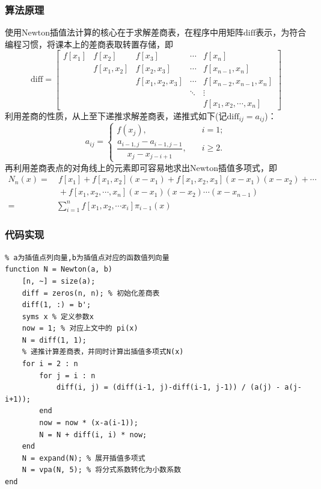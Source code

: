\documentclass[12pt, a4paper, oneside]{ctexart}
\begin{document}
\subsubsection{算法原理}
使用$\text{Newton插值法}$计算的核心在于求解差商表，在程序中用矩阵$\text{diff}$表示，为符合编程习惯，将课本上的差商表取转置存储，即
\begin{equation*}
    \text{diff} = \left[\begin{matrix}
        f[x_1]&f[x_2]&f[x_3]&\cdots&f[x_n]\\
        &f[x_1,x_2]&f[x_2,x_3]&\cdots&f[x_{n-1},x_n]\\
        & &f[x_1,x_2,x_3]&\cdots &f[x_{n-2},x_{n-1},x_n]\\
        & & & \ddots &\vdots\\
        & & & & f[x_1,x_2,\cdots,x_n]
    \end{matrix}\right]
\end{equation*}
利用差商的性质，从上至下递推求解差商表，递推式如下(记$\text{diff}_{ij} = a_{ij}$)：
\begin{equation*}
    a_{ij}=
    \begin{cases}
        f(x_j),&\quad i = 1;\\
        \dfrac{a_{i-1,j}-a_{i-1,j-1}}{x_j-x_{j-i+1}}, &\quad i\geqslant 2.
    \end{cases}
\end{equation*}
再利用差商表点的对角线上的元素即可容易地求出$\text{Newton插值多项式}$，即
\begin{equation*}
    \begin{aligned}
        N_n(x) = &\ f[x_1]+f[x_1,x_2](x-x_1)+f[x_1,x_2,x_3](x-x_1)(x-x_2)+\cdots\\
                &\ +f[x_1,x_2,\cdots,x_n](x-x_1)(x-x_2)\cdots(x-x_{n-1})\\
                =&\sum_{i=1}^nf[x_1,x_2,\cdots x_i]\pi_{i-1}(x)
    \end{aligned}
\end{equation*}
\subsubsection{代码实现}
\begin{lstlisting}
% a为插值点列向量,b为插值点对应的函数值列向量
function N = Newton(a, b)
    [n, ~] = size(a);
    diff = zeros(n, n); % 初始化差商表
    diff(1, :) = b';
    syms x % 定义参数x
    now = 1; % 对应上文中的 pi(x)
    N = diff(1, 1);
    % 递推计算差商表，并同时计算出插值多项式N(x)
    for i = 2 : n
        for j = i : n
            diff(i, j) = (diff(i-1, j)-diff(i-1, j-1)) / (a(j) - a(j-i+1));
        end
        now = now * (x-a(i-1));
        N = N + diff(i, i) * now;
    end
    N = expand(N); % 展开插值多项式
    N = vpa(N, 5); % 将分式系数转化为小数系数
end
\end{lstlisting}
\end{document}
